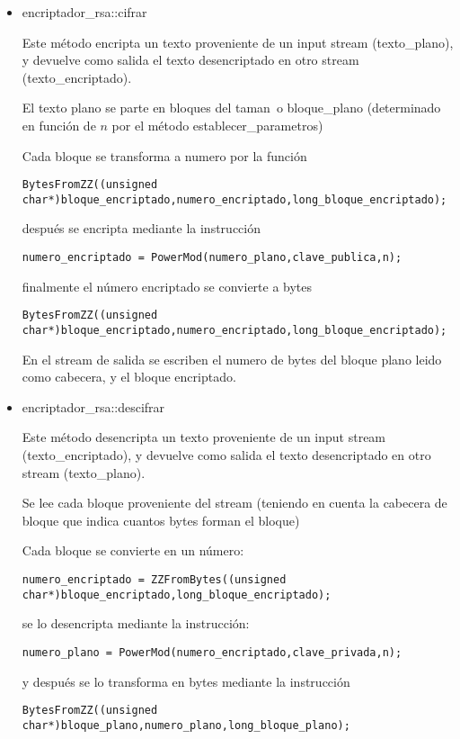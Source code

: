 \documentclass[spanish]{article}
\begin{document}
\begin{itemize}
\item encriptador\_rsa::cifrar

Este método encripta un texto proveniente de un input stream 
(texto\_plano), y devuelve como salida el texto desencriptado
en otro stream (texto\_encriptado).

El texto plano se parte en bloques del taman~o bloque\_plano (determinado 
en función de $n$ por el método establecer\_parametros)

Cada bloque se transforma a numero por la función

\begin{verbatim}
BytesFromZZ((unsigned char*)bloque_encriptado,numero_encriptado,long_bloque_encriptado);
\end{verbatim}

después se encripta mediante la instrucción 

\begin{verbatim}
numero_encriptado = PowerMod(numero_plano,clave_publica,n);
\end{verbatim}

finalmente el número encriptado se convierte a bytes

\begin{verbatim}
BytesFromZZ((unsigned char*)bloque_encriptado,numero_encriptado,long_bloque_encriptado);
\end{verbatim}

En el stream de salida se escriben el numero de bytes del bloque plano leido 
como cabecera, y el bloque encriptado.

\item encriptador\_rsa::descifrar

Este método desencripta un texto proveniente de un input stream 
(texto\_encriptado), y devuelve como salida el texto desencriptado
en otro stream (texto\_plano).

Se lee cada bloque proveniente del stream (teniendo en cuenta la cabecera
de bloque que indica cuantos bytes forman el bloque)

Cada bloque se convierte en un número:

\begin{verbatim}
numero_encriptado = ZZFromBytes((unsigned char*)bloque_encriptado,long_bloque_encriptado);
\end{verbatim}

se lo desencripta mediante la instrucción:

\begin{verbatim}
numero_plano = PowerMod(numero_encriptado,clave_privada,n);
\end{verbatim}

y después se lo transforma en bytes mediante la instrucción

\begin{verbatim}
BytesFromZZ((unsigned char*)bloque_plano,numero_plano,long_bloque_plano);
\end{verbatim}

\end{itemize}
\end{document}
